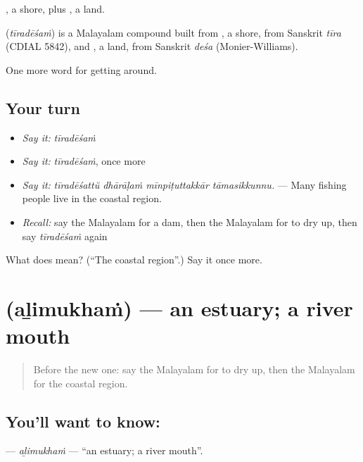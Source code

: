 , a shore, plus , a land.

\begin{cousinweb}
\textbf{} (\emph{tīradēśaṁ}) is a Malayalam compound built from , a shore, from Sanskrit \emph{tīra} (CDIAL 5842), and , a land, from Sanskrit \emph{deśa} (Monier-Williams).
\end{cousinweb}

\begin{grammarlens}[title={What you've built}]
One more word for getting around.
\end{grammarlens}

\subsection*{Your turn}
\begin{itemize}
\raggedright
  \item \emph{Say it:} \emph{tīradēśaṁ}
  \item \emph{Say it:} \emph{tīradēśaṁ}, once more
  \item \emph{Say it:} \emph{tīradēśattŭ dhārāḷaṁ mīnpiṭuttakkār tāmasikkunnu.} — Many fishing people live in the coastal region.
  \item \emph{Recall:} say the Malayalam for a dam, then the Malayalam for to dry up, then say \emph{tīradēśaṁ} again
\end{itemize}

\begin{tcolorbox}[breakable,colback=teal!4,colframe=teal!35!black,title={Before you move on}]
What does  mean? (\textquotedblleft{}The coastal region\textquotedblright{}.) Say it once more.
\end{tcolorbox}
\section[\texorpdfstring{\ml{അഴിമുഖം} (aḻimukhaṁ)}{അഴിമുഖം (aḻimukhaṁ)}]{ (aḻimukhaṁ) — an estuary; a river mouth}

\label{lesson:ML-C497-alimukham}



\begin{quote}
Before the new one: say the Malayalam for to dry up, then the Malayalam for the coastal region.
\end{quote}

\subsection*{You'll want to know: }
\textbf{} — \emph{aḻimukhaṁ} — \textquotedblleft{}an estuary; a river mouth\textquotedblright{}.

